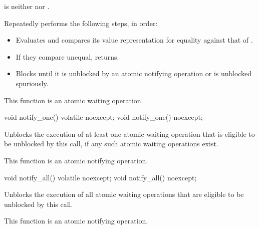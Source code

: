 \begin{itemdescr}
\pnum
\expects
{} is neither  nor .

\pnum
\effects
Repeatedly performs the following steps, in order:
\begin{itemize}
\item
  Evaluates  and
  compares its value representation for equality against that of .
\item
  If they compare unequal, returns.
\item
  Blocks until it
  is unblocked by an atomic notifying operation or is unblocked spuriously.
\end{itemize}

\pnum
\remarks
This function is an atomic waiting operation.
\end{itemdescr}

%
%
%
%
\begin{itemdecl}
void notify_one() volatile noexcept;
void notify_one() noexcept;
\end{itemdecl}

\begin{itemdescr}
\pnum
\effects
Unblocks the execution of at least one atomic waiting operation
that is eligible to be unblocked by this call,
if any such atomic waiting operations exist.

\pnum
\remarks
This function is an atomic notifying operation.
\end{itemdescr}

%
%
%
%
\begin{itemdecl}
void notify_all() volatile noexcept;
void notify_all() noexcept;
\end{itemdecl}

\begin{itemdescr}
\pnum
\effects
Unblocks the execution of all atomic waiting operations
that are eligible to be unblocked by this call.

\pnum
\remarks
This function is an atomic notifying operation.
\end{itemdescr}

